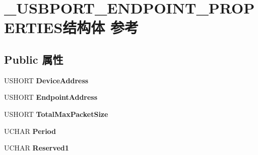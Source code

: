 \hypertarget{struct___u_s_b_p_o_r_t___e_n_d_p_o_i_n_t___p_r_o_p_e_r_t_i_e_s}{}\section{\+\_\+\+U\+S\+B\+P\+O\+R\+T\+\_\+\+E\+N\+D\+P\+O\+I\+N\+T\+\_\+\+P\+R\+O\+P\+E\+R\+T\+I\+E\+S结构体 参考}
\label{struct___u_s_b_p_o_r_t___e_n_d_p_o_i_n_t___p_r_o_p_e_r_t_i_e_s}
\subsection*{Public 属性}
\begin{DoxyCompactItemize}
\item 
\mbox{\label{struct___u_s_b_p_o_r_t___e_n_d_p_o_i_n_t___p_r_o_p_e_r_t_i_e_s_ab6c134e5b80dce8c6b755b2325383beb}} 
U\+S\+H\+O\+RT {\bfseries Device\+Address}
\item 
\mbox{\label{struct___u_s_b_p_o_r_t___e_n_d_p_o_i_n_t___p_r_o_p_e_r_t_i_e_s_a04ae187d1058708aff4e24a6bd590e54}} 
U\+S\+H\+O\+RT {\bfseries Endpoint\+Address}
\item 
\mbox{\label{struct___u_s_b_p_o_r_t___e_n_d_p_o_i_n_t___p_r_o_p_e_r_t_i_e_s_ab7c21d9eb74735b29f9af2aebe2ffd7a}} 
U\+S\+H\+O\+RT {\bfseries Total\+Max\+Packet\+Size}
\item 
\mbox{\label{struct___u_s_b_p_o_r_t___e_n_d_p_o_i_n_t___p_r_o_p_e_r_t_i_e_s_ac0d5794383f151c577be8a49441a1a8f}} 
U\+C\+H\+AR {\bfseries Period}
\item 
\mbox{\label{struct___u_s_b_p_o_r_t___e_n_d_p_o_i_n_t___p_r_o_p_e_r_t_i_e_s_a074ee73cf815f1c84c2999bede4bc79c}} 
U\+C\+H\+AR {\bfseries Reserved1}
\item 
\mbox{\label{struct___u_s_b_p_o_r_t___e_n_d_p_o_i_n_t___p_r_o_p_e_r_t_i_e_s_ab5122eb47ff776742b8113303ef9c2c0}} 

\end{DoxyCompactItemize}
